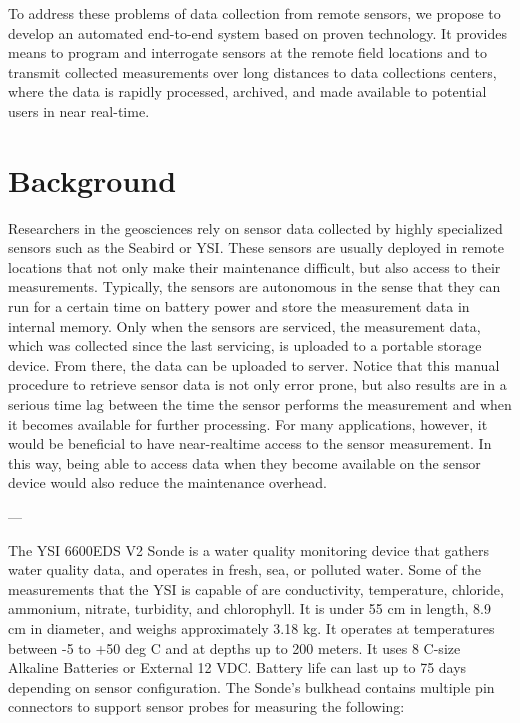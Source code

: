 \documentclass[conference]{IEEEtran}
\begin{document}
To address these problems of data collection from remote
sensors, we propose to develop an automated end-to-end system based on
proven technology. It provides means to program and interrogate
sensors at the remote field locations and to transmit collected
measurements over long distances to data collections centers, where the
data is rapidly processed, archived, and made available to potential
users in near real-time.

\section{Background}
\label{SEC_BACKGROUND}

Researchers in the geosciences rely on sensor data collected by highly
specialized sensors such as the Seabird or YSI. These sensors are
usually deployed in remote locations that not only make their
maintenance difficult, but also access to their measurements.
Typically, the sensors are autonomous in the sense that they can run
for a certain time on battery power and store the measurement data in
internal memory. Only when the sensors are serviced, the measurement
data, which was collected since the last servicing, is uploaded to a 
portable storage device. From there, the data can be uploaded to
server. Notice that this manual procedure to retrieve sensor data is not only
error prone, but also results are in a serious time lag between the time
the sensor performs the measurement and when it becomes available for
further processing. For many applications, however, it would be beneficial to
have near-realtime access to the sensor measurement. In this way, being able 
to access data when they become available on the sensor device would also
reduce the maintenance overhead.

---

The YSI 6600EDS V2 Sonde \cite{Sonde01} is a water quality monitoring device that
gathers water quality data, and operates in fresh, sea, or polluted
water. Some of the measurements that the YSI is capable of are
conductivity, temperature, chloride, ammonium, nitrate, turbidity, and
chlorophyll.  It is under 55 cm in length, 8.9 cm in diameter, and
weighs approximately 3.18 kg. It operates at temperatures between -5
to +50 deg C and at depths up to 200 meters.  It uses 8 C-size
Alkaline Batteries or External 12 VDC. Battery life can last up to 75
days depending on sensor configuration. The Sonde's bulkhead contains
multiple pin connectors to support sensor probes for measuring the
following:
\end{document}
